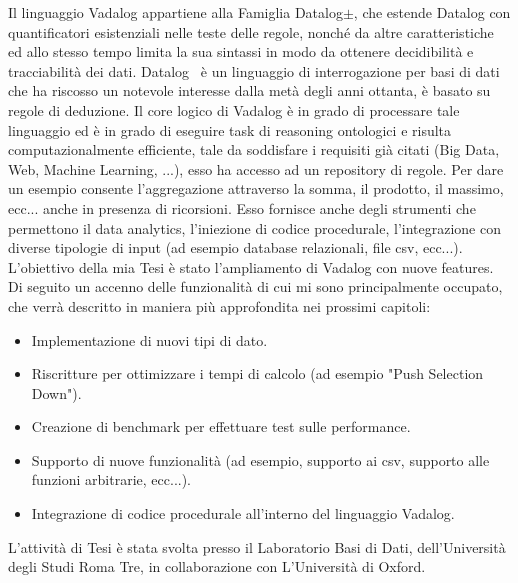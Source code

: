 Il linguaggio Vadalog appartiene alla Famiglia Datalog$\pm $, che estende Datalog con quantificatori esistenziali nelle teste delle regole, nonché da altre caratteristiche ed allo stesso tempo limita la sua sintassi in modo da ottenere decidibilità e tracciabilità dei dati.\newline
Datalog~\cite{Atzeni:DATALOG} è un linguaggio di interrogazione per basi di dati che ha riscosso un notevole interesse dalla metà degli anni ottanta, è basato su regole di deduzione. \newline
Il core logico di Vadalog è in grado di processare tale linguaggio ed è in grado di eseguire task di reasoning ontologici e risulta computazionalmente efficiente, tale da soddisfare i requisiti già citati (Big Data, Web, Machine Learning, ...), esso ha accesso ad un repository di regole. Per dare un esempio consente l'aggregazione attraverso la somma, il prodotto, il massimo, ecc... anche in presenza di ricorsioni. \newline
Esso fornisce anche degli strumenti che permettono il data analytics, l'iniezione di codice procedurale, l'integrazione con diverse tipologie di input (ad esempio database relazionali, file csv, ecc...).\newline \newline
L'obiettivo della mia Tesi è stato l'ampliamento di Vadalog con nuove features. \newline
Di seguito un accenno delle funzionalità di cui mi sono principalmente occupato, che verrà descritto in maniera più approfondita nei prossimi capitoli:
\begin{itemize}
	\item Implementazione di nuovi tipi di dato.
	\item Riscritture per ottimizzare i tempi di calcolo (ad esempio "Push Selection Down").
	\item Creazione di benchmark per effettuare test sulle performance.
	\item Supporto di nuove funzionalità (ad esempio, supporto ai csv, supporto alle funzioni arbitrarie, ecc...).
	\item Integrazione di codice procedurale all'interno del linguaggio Vadalog.
\end{itemize}
L'attività di Tesi è stata svolta presso il Laboratorio Basi di Dati, dell'Università degli Studi Roma Tre, in collaborazione con L'Università di Oxford.
